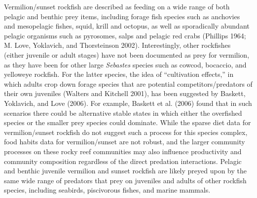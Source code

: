 \documentclass[
  english,
  a4paper,
]{article}
\begin{document}
Vermilion/sunset rockfish are described as feeding on a wide range of both
pelagic and benthic prey items, including forage fish species such as anchovies
and mesopelagic fishes, squid, krill and octopus, as well as sporadically abundant
pelagic organisms such as pyrosomes, salps and pelagic red crabs
(Phillips 1964; M. Love, Yoklavich, and Thorsteinson 2002). Interestingly, other rockfishes (either juvenile or
adult stages) have not been
documented as prey for vermilion, as they have been for other large \emph{Sebastes}
species such as cowcod, bocaccio, and yelloweye rockfish. For the latter species,
the idea of ``cultivation effects,'' in which adults crop down forage species that
are potential competitors/predators of their own juveniles (Walters and Kitchell 2001),
has been suggested by Baskett, Yoklavich, and Love (2006). For example, Baskett et al. (2006)
found that in such scenarios there could be alternative stable states in which
either the overfished species or the smaller prey species could dominate. While
the sparse diet data for vermilion/sunset rockfish do not suggest such a process
for this species complex, food habits data for vermilion/sunset are not robust,
and the larger community processes on these rocky reef communities may also influence
productivity and community composition regardless of the direct predation interactions.
Pelagic and benthic juvenile vermilion and sunset rockfish are likely preyed upon by
the same wide range of predators that prey on juveniles and adults of other rockfish
species, including seabirds, piscivorous fishes, and marine mammals.
\end{document}
